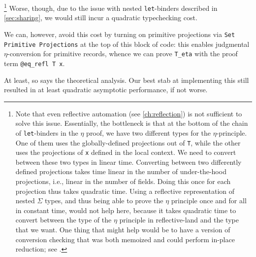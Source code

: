   \footnote{%
      Note that even reflective automation (see \autoref{ch:reflection}) is not sufficient to solve this issue.
      Essentially, the bottleneck is that at the bottom of the chain of \texttt{let}-binders in the $\eta$ proof, we have two different types for the $\eta$-principle.
      One of them uses the globally-defined projections out of \texttt{T}, while the other uses the projections of \texttt{x} defined in the local context.
      We need to convert between these two types in linear time.
      Converting between two differently defined projections takes time linear in the number of under-the-hood projections, i.e., linear in the number of fields.
      Doing this once for each projection thus takes quadratic time.
      Using a reflective representation of nested $\Sigma$ types, and thus being able to prove the $\eta$ principle once and for all in constant time, would not help here, because it takes quadratic time to convert between the type of the $\eta$ principle in reflective-land and the type that we want.
      One thing that might help would be to have a version of conversion checking that was both memoized and could perform in-place reduction; see .%
  }
  Worse, though, due to the issue with nested \texttt{let}-binders described in \autoref{sec:sharing}, we would still incur a quadratic typechecking cost.

  We can, however, avoid this cost by turning on primitive projections via \texttt{Set Primitive Projections} at the top of this block of code:
  this enables judgmental $\eta$-conversion for primitive records, whence we can prove \texttt{T_eta} with the proof term \texttt{@eq_refl T x}.

  At least, so says the theoretical analysis.
  Our best stab at implementing this still resulted in at least quadratic asymptotic performance, if not worse.

